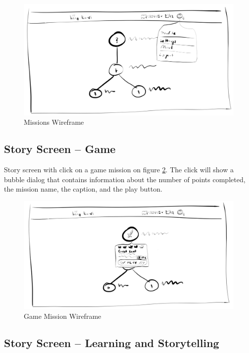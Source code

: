 \begin{figure}
    \centering
    \includegraphics[width=1\linewidth]{assets/design/ui/wir_stories.png}
    \caption{Missions Wireframe}
    \label{fig:design:wir:missions}
\end{figure}

\subsection{Story Screen -- Game}

Story screen with click on a game mission on figure \ref{fig:design:wir:story-game}.
The click will show a bubble dialog that contains information about the number of points completed, the mission name, the caption, and the play button.

\begin{figure}
    \centering
    \includegraphics[width=1\linewidth]{assets/design/ui/wir_game.png}
    \caption{Game Mission Wireframe}
    \label{fig:design:wir:story-game}
\end{figure}

\subsection{Story Screen -- Learning and Storytelling}

